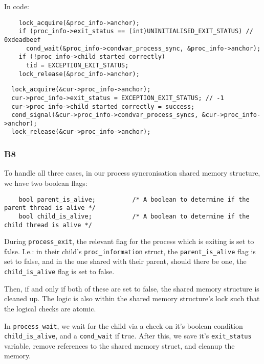 \documentclass[a4wide, 11pt]{article}
\newcommand{\tx}{\texttt}
\begin{document}
In code:

\begin{verbatim}
    lock_acquire(&proc_info->anchor);
    if (proc_info->exit_status == (int)UNINITIALISED_EXIT_STATUS) // 0xdeadbeef
      cond_wait(&proc_info->condvar_process_sync, &proc_info->anchor);
    if (!proc_info->child_started_correctly)
      tid = EXCEPTION_EXIT_STATUS;
    lock_release(&proc_info->anchor);
\end{verbatim}

\begin{verbatim}
  lock_acquire(&cur->proc_info->anchor);
  cur->proc_info->exit_status = EXCEPTION_EXIT_STATUS; // -1
  cur->proc_info->child_started_correctly = success;
  cond_signal(&cur->proc_info->condvar_process_syncs, &cur->proc_info->anchor);
  lock_release(&cur->proc_info->anchor);
\end{verbatim}

\subsubsection{B8}

To handle all three cases, in our process syncronisation shared memory structure, we have two boolean flags:

\begin{verbatim}
    bool parent_is_alive;          /* A boolean to determine if the parent thread is alive */
    bool child_is_alive;           /* A boolean to determine if the child thread is alive */
\end{verbatim}

During \tx{process\_exit}, the relevant flag for the process which is exiting is set to false. I.e.: in their child's \tx{proc\_information} struct, the \tx{parent\_is\_alive} flag is set to false, and in the one shared with their parent, should there be one, the \tx{child\_is\_alive} flag is set to false.

Then, if and only if both of these are set to false, the shared memory structure is cleaned up. The logic is also within the shared memory structure's lock such that the logical checks are atomic.

In \tx{process\_wait}, we wait for the child via a check on it's boolean condition \texttt{child\_is\_alive}, and a \texttt{cond\_wait} if true. After this, we save it's \texttt{exit\_status} variable, remove references to the shared memory struct, and cleanup the memory.
\end{document}
